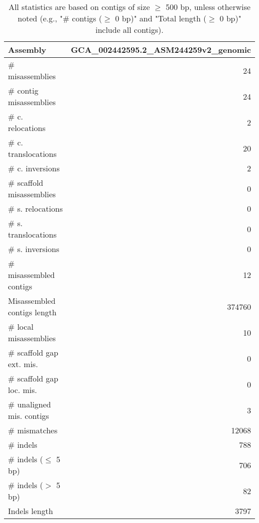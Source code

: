 \documentclass[12pt,a4paper]{article}
\begin{document}
\begin{table}[ht]
\begin{center}
\caption{All statistics are based on contigs of size $\geq$ 500 bp, unless otherwise noted (e.g., "\# contigs ($\geq$ 0 bp)" and "Total length ($\geq$ 0 bp)" include all contigs).}
\begin{tabular}{|l*{1}{|r}|}
\hline
Assembly & GCA\_002442595.2\_ASM244259v2\_genomic \\ \hline
\# misassemblies & 24 \\ \hline
\hspace{2mm}\# contig misassemblies & 24 \\ \hline
\hspace{5mm}\# c. relocations & 2 \\ \hline
\hspace{5mm}\# c. translocations & 20 \\ \hline
\hspace{5mm}\# c. inversions & 2 \\ \hline
\hspace{2mm}\# scaffold misassemblies & 0 \\ \hline
\hspace{5mm}\# s. relocations & 0 \\ \hline
\hspace{5mm}\# s. translocations & 0 \\ \hline
\hspace{5mm}\# s. inversions & 0 \\ \hline
\# misassembled contigs & 12 \\ \hline
Misassembled contigs length & 374760 \\ \hline
\# local misassemblies & 10 \\ \hline
\# scaffold gap ext. mis. & 0 \\ \hline
\# scaffold gap loc. mis. & 0 \\ \hline
\# unaligned mis. contigs & 3 \\ \hline
\# mismatches & 12068 \\ \hline
\# indels & 788 \\ \hline
\hspace{5mm}\# indels ($\leq$ 5 bp) & 706 \\ \hline
\hspace{5mm}\# indels ($>$ 5 bp) & 82 \\ \hline
Indels length & 3797 \\ \hline
\end{tabular}
\end{center}
\end{table}
\end{document}
